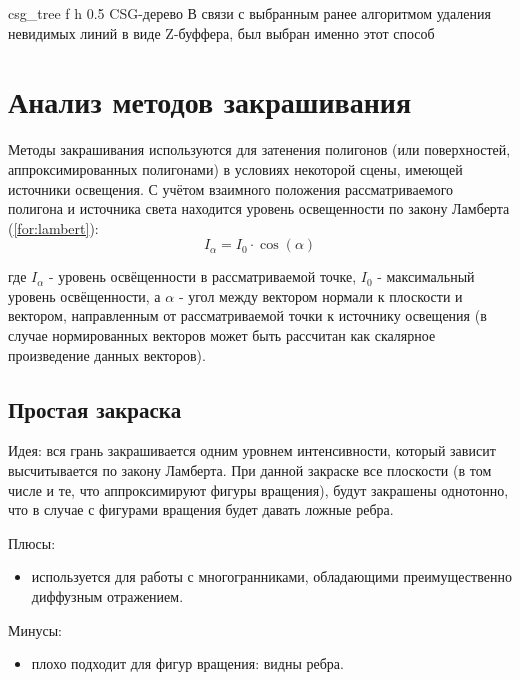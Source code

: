 {csg_tree} %
{f} %
{h} %
{0.5\textwidth} %
{CSG-дерево} %
В связи с выбранным ранее алгоритмом удаления невидимых линий в виде Z-буффера, был выбран именно этот способ

\section{Анализ методов закрашивания}

Методы закрашивания используются для затенения полигонов (или поверхностей, аппроксимированных полигонами) в условиях некоторой сцены, имеющей источники освещения. С учётом взаимного положения рассматриваемого полигона и источника света находится уровень освещенности по закону Ламберта (\ref{for:lambert}):
\begin{equation}
    \label{for:lambert}
    I_{\alpha} = I_0 \cdot \cos{(\alpha)}
\end{equation}

где $I_{\alpha}$ - уровень освёщенности в рассматриваемой точке, $I_0$ - максимальный уровень освёщенности, а $\alpha$ - угол между вектором нормали к плоскости и вектором, направленным от рассматриваемой точки к источнику освещения (в случае нормированных векторов может быть рассчитан как скалярное произведение данных векторов).

\subsection{Простая закраска}

Идея: вся грань закрашивается одним уровнем интенсивности, который зависит высчитывается по закону Ламберта\cite{rogers}. При данной закраске все плоскости (в том числе и те, что аппроксимируют фигуры вращения), будут закрашены однотонно, что в случае с фигурами вращения будет давать ложные ребра.

Плюсы:
\begin{itemize}
    \item используется для работы с многогранниками, обладающими преимущественно диффузным отражением.
\end{itemize}

Минусы:

\begin{itemize}
    \item плохо подходит для фигур вращения: видны ребра.
\end{itemize}

